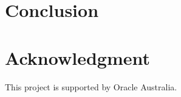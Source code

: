 \section{Conclusion}


\label{sec:conclude}
\section*{Acknowledgment}

This project is supported by Oracle Australia.
